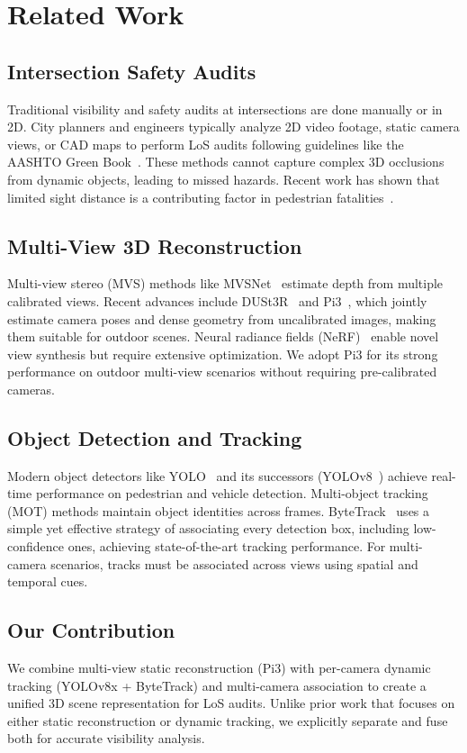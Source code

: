 \section{Related Work}
\label{sec:related}

\subsection{Intersection Safety Audits}
Traditional visibility and safety audits at intersections are done manually or in 2D. City planners and engineers typically analyze 2D video footage, static camera views, or CAD maps to perform LoS audits following guidelines like the AASHTO Green Book~\cite{aashto2018greenbook}. These methods cannot capture complex 3D occlusions from dynamic objects, leading to missed hazards. Recent work has shown that limited sight distance is a contributing factor in pedestrian fatalities~\cite{nhtsa2023pedestrian,lord2007safety}.

\subsection{Multi-View 3D Reconstruction}
Multi-view stereo (MVS) methods like MVSNet~\cite{yao2018mvsnet} estimate depth from multiple calibrated views. Recent advances include DUSt3R~\cite{dust3r} and Pi3~\cite{pi3}, which jointly estimate camera poses and dense geometry from uncalibrated images, making them suitable for outdoor scenes. Neural radiance fields (NeRF)~\cite{mildenhall2020nerf} enable novel view synthesis but require extensive optimization. We adopt Pi3 for its strong performance on outdoor multi-view scenarios without requiring pre-calibrated cameras.

\subsection{Object Detection and Tracking}
Modern object detectors like YOLO~\cite{redmon2016yolo} and its successors (YOLOv8~\cite{yolov8}) achieve real-time performance on pedestrian and vehicle detection. Multi-object tracking (MOT) methods maintain object identities across frames. ByteTrack~\cite{bytetrack} uses a simple yet effective strategy of associating every detection box, including low-confidence ones, achieving state-of-the-art tracking performance. For multi-camera scenarios, tracks must be associated across views using spatial and temporal cues.

\subsection{Our Contribution}
We combine multi-view static reconstruction (Pi3) with per-camera dynamic tracking (YOLOv8x + ByteTrack) and multi-camera association to create a unified 3D scene representation for LoS audits. Unlike prior work that focuses on either static reconstruction or dynamic tracking, we explicitly separate and fuse both for accurate visibility analysis.
